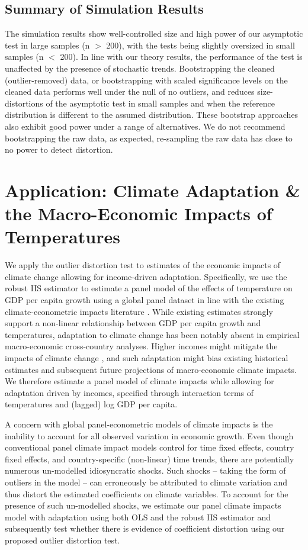 \documentclass[11pt, letterpaper]{article}
\numberwithin{algorithm}{section}
\numberwithin{assumption}{section}
\numberwithin{lemma}{section}
\numberwithin{theorem}{section}
\numberwithin{corollary}{section}
\numberwithin{remark}{section}
\numberwithin{equation}{section}
\numberwithin{figure}{section}
\numberwithin{table}{section}
\begin{document}
\subsection{Summary of Simulation Results}
The simulation results show well-controlled size and high power of our asymptotic test in large samples (n $>$ 200), with the tests being slightly oversized in small samples (n $<$ 200). In line with our theory results, the performance of the test is unaffected by the presence of stochastic trends. Bootstrapping the cleaned (outlier-removed) data, or bootstrapping with scaled significance levels on the cleaned data performs well under the null of no outliers, and reduces size-distortions of the asymptotic test in small samples and when the reference distribution is different to the assumed distribution. These bootstrap approaches also exhibit good power under a range of alternatives. We do not recommend bootstrapping the raw data, as expected, re-sampling the raw data has close to no power to detect distortion.



\section{Application: Climate Adaptation \& the Macro-Economic Impacts of Temperatures} \label{sec_application}
We apply the outlier distortion test to estimates of the economic impacts of climate change allowing for income-driven adaptation. Specifically, we use the robust IIS estimator to estimate a panel model of the effects of temperature on GDP per capita growth using a global panel dataset in line with the existing climate-econometric impacts literature \cite[e.g.][]{burke2015global, dell2012temperature, pretis2018uncertain}. While existing estimates strongly support a non-linear relationship between GDP per capita growth and temperatures, adaptation to climate change has been notably absent in empirical macro-economic cross-country analyses. Higher incomes might mitigate the impacts of climate change \citep[see e.g. ][]{acevedo2020effects, schwarz2020modelling}, and such adaptation might bias existing historical estimates and subsequent future projections of macro-economic climate impacts. We therefore estimate a panel model of climate impacts while allowing for adaptation driven by incomes, specified through interaction terms of temperatures and (lagged) log GDP per capita.

A concern with global panel-econometric  models of climate impacts is the inability to account for all observed variation in economic growth. Even though conventional panel climate impact models control for time fixed effects, country fixed effects, and country-specific (non-linear) time trends, there are potentially numerous un-modelled idiosyncratic shocks. Such shocks -- taking the form of outliers in the model -- can erroneously be attributed to climate variation and thus distort the estimated coefficients on climate variables. To account for the presence of such un-modelled shocks, we estimate our panel climate impacts model with adaptation using both OLS and the robust IIS estimator and subsequently test whether there is evidence of coefficient distortion using our proposed outlier distortion test.
\end{document}
